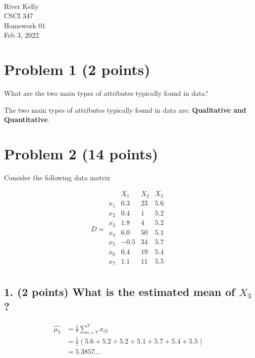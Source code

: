 \documentclass[11pt]{article}
\newcommand{\course}{CSCI 347}
\newcommand{\proj}{Homework 01}
\begin{document}
{ ~\\
    River Kelly \\
    \course \\
    \proj \\
    Feb 3, 2022 \\
}

\section*{Problem 1 (2 points)}

What are the two main types of attributes typically found in data?
\begin{tcolorbox}[width=\linewidth,title=Problem 1]
The two main types of attributes typically found in data are: \textbf{Qualitative and Quantitative}.
\end{tcolorbox}

\section*{Problem 2 (14 points)}

Consider the following data matrix

$$
    D = \begin{matrix}
            & X_1   & X_2   & X_3 \\
        x_1 &  0.3  & 23    & 5.6 \\
        x_2 &  0.4  &  1    & 5.2 \\
        x_3 &  1.8  &  4    & 5.2 \\
        x_4 &  6.0  & 50    & 5.1 \\
        x_5 & -0.5  & 34    & 5.7 \\
        x_6 &  0.4  & 19    & 5.4 \\
        x_7 &  1.1  & 11    & 5.5 \\
    \end{matrix}
$$

\subsection*{\textbf{1. (2 points)} What is the estimated mean of $X_3$?}

\begin{align*}
    \hat{\mu_3} &= \frac{1}{7} \sum_{i=7}^{7} x_{i3}\\
    &= \frac{1}{7}(5.6 + 5.2 + 5.2 + 5.1 + 5.7 + 5.4 + 5.5)\\
    &= 5.3857...
\end{align*}
\end{document}
